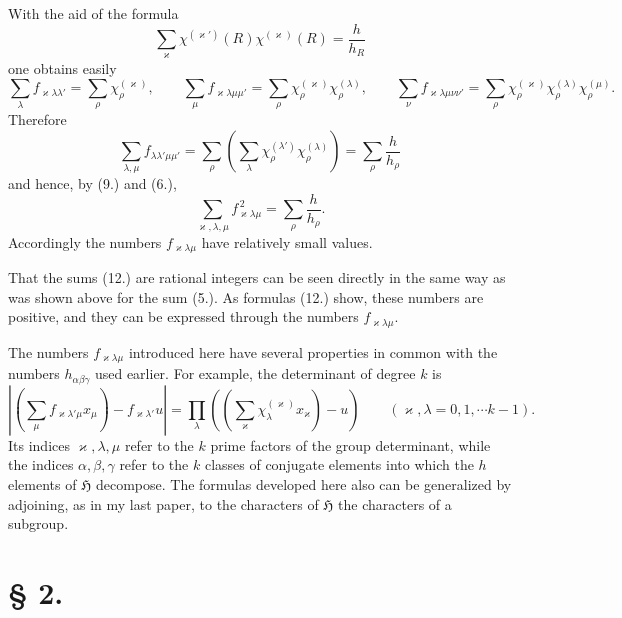 \documentclass[11pt]{article}
\newcommand{\Hgr}{\mathfrak{H}}
\begin{document}
With the aid of the formula
\begin{equation*}\tag{11.}
\sum_\varkappa \chi^{(\varkappa')}(R)\chi^{(\varkappa)}(R)=\frac{h}{h_R}
\end{equation*}
one obtains easily
\begin{equation*}\tag{12.}
\sum_\lambda f_{\varkappa\lambda\lambda'}=\sum_\rho \chi_\rho^{(\varkappa)},\qquad
\sum_\mu f_{\varkappa\lambda\mu\mu'}=\sum_\rho \chi_\rho^{(\varkappa)}\chi_\rho^{(\lambda)},\qquad
\sum_\nu f_{\varkappa\lambda\mu\nu\nu'}=\sum_\rho \chi_\rho^{(\varkappa)}\chi_\rho^{(\lambda)}\chi_\rho^{(\mu)}.
\end{equation*}
Therefore
\[
\sum_{\lambda,\mu}f_{\lambda\lambda'\mu\mu'}
=\sum_\rho\left(\sum_\lambda \chi_\rho^{(\lambda')}\chi_\rho^{(\lambda)}\right)
=\sum_\rho\frac{h}{h_\rho}
\]
and hence, by (9.) and (6.),
\begin{equation*}\tag{13.}
\sum_{\varkappa,\lambda,\mu} f_{\varkappa\lambda\mu}^{\,2}
=\sum_\rho\frac{h}{h_\rho}.
\end{equation*}
Accordingly the numbers $f_{\varkappa\lambda\mu}$ have relatively small values.

That the sums (12.) are rational integers can be seen directly in the same way as was shown above for the sum (5.). As formulas (12.) show, these numbers are positive, and they can be expressed through the numbers $f_{\varkappa\lambda\mu}$.

The numbers $f_{\varkappa\lambda\mu}$ introduced here have several properties in common with the numbers $h_{\alpha\beta\gamma}$ used earlier. For example, the determinant of degree $k$ is
\begin{equation*}\tag{14.}
\left|\left(\sum_\mu f_{\varkappa\lambda'\mu}x_\mu\right)-f_{\varkappa\lambda'}u\right|
=\prod_\lambda\left(\left(\sum_\varkappa \chi_\lambda^{(\varkappa)}x_\varkappa\right)-u\right)
\qquad(\varkappa,\lambda=0,1,\cdots k-1).
\end{equation*}
Its indices $\varkappa,\lambda,\mu$ refer to the $k$ prime factors of the group determinant, while the indices $\alpha,\beta,\gamma$ refer to the $k$ classes of conjugate elements into which the $h$ elements of $\Hgr$ decompose. The formulas developed here also can be generalized by adjoining, as in my last paper, to the characters of $\Hgr$ the characters of a subgroup.

\section*{§ 2.}
\end{document}
